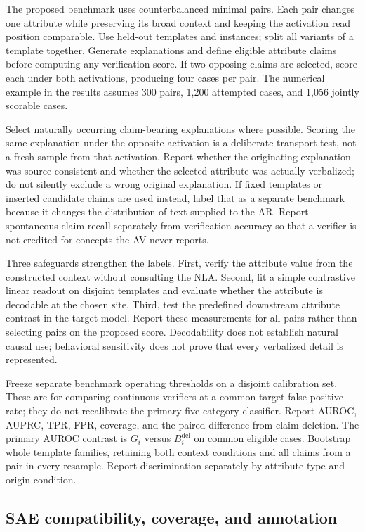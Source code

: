 The proposed benchmark uses counterbalanced minimal pairs. Each pair changes
one attribute while preserving its broad context and keeping the activation
read position comparable. Use held-out templates and instances; split all
variants of a template together. Generate explanations and define eligible
attribute claims before computing any verification score. If two opposing
claims are selected, score each under both activations, producing four cases
per pair. The numerical example in the results assumes 300 pairs, 1,200
attempted cases, and 1,056 jointly scorable cases.

Select naturally occurring claim-bearing explanations where possible. Scoring
the same explanation under the opposite activation is a deliberate transport
test, not a fresh sample from that activation. Report whether the originating
explanation was source-consistent and whether the selected attribute was
actually verbalized; do not silently exclude a wrong original explanation.
If fixed templates or inserted candidate claims are used instead, label that
as a separate benchmark because it changes the distribution of text supplied
to the AR. Report spontaneous-claim recall separately from verification
accuracy so that a verifier is not credited for concepts the AV never reports.

Three safeguards strengthen the labels. First, verify the attribute value from
the constructed context without consulting the NLA. Second, fit a simple
contrastive linear readout on disjoint templates and evaluate whether the
attribute is decodable at the chosen site. Third, test the predefined downstream
attribute contrast in the target model. Report these measurements for all
pairs rather than selecting pairs on the proposed score. Decodability does
not establish natural causal use; behavioral sensitivity does not prove that
every verbalized detail is represented.

Freeze separate benchmark operating thresholds on a disjoint calibration set.
These are for comparing continuous verifiers at a common target false-positive
rate; they do not recalibrate the primary five-category classifier. Report
AUROC, AUPRC, TPR, FPR, coverage, and the paired difference from claim deletion.
The primary AUROC contrast is $G_i$ versus $B_i^{\mathrm{del}}$ on common
eligible cases. Bootstrap whole template families, retaining both context
conditions and all claims from a pair in every resample. Report discrimination
separately by attribute type and origin condition.

\subsection{SAE compatibility, coverage, and annotation}

